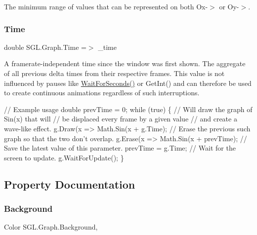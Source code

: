 The minimum range of values that can be represented on both Ox-\/$>$ or Oy-\/$>$. 

\mbox{\label{class_s_g_l_1_1_graph_a900eb624d0906d4e14a0f0a0be4ad791}} 
\subsubsection{\texorpdfstring{Time}{Time}}
{\footnotesize\ttfamily double S\+G\+L.\+Graph.\+Time =$>$ \+\_\+time}



A framerate-\/independent time since the window was first shown. The aggregate of all previous delta times from their respective frames. This value is not influenced by pauses like \mbox{\hyperlink{class_s_g_l_1_1_graph_aac0d51ab73e1f78788e9ecb6afc9d532}{Wait\+For\+Seconds()}} or Get\+Int() and can therefore be used to create continuous animations regardless of such interruptions. 


\begin{DoxyCode}
\textcolor{comment}{// Example usage}
\textcolor{keywordtype}{double} prevTime = 0;
\textcolor{keywordflow}{while} (\textcolor{keyword}{true}) 
\{   
    \textcolor{comment}{// Will draw the graph of Sin(x) that will}
    \textcolor{comment}{// be displaced every frame by a given value }
    \textcolor{comment}{// and create a wave-like effect.}
    g.Draw(x => Math.Sin(x + g.Time);
    \textcolor{comment}{// Erase the previous such graph so that the two don't overlap. }
    g.Erase(x => Math.Sin(x + prevTime);
    \textcolor{comment}{// Save the latest value of this parameter.}
    prevTime = g.Time;
    \textcolor{comment}{// Wait for the screen to update.}
    g.WaitForUpdate();
\}
\end{DoxyCode}
 

\subsection{Property Documentation}
\mbox{\label{class_s_g_l_1_1_graph_a56d255eb64277564347b848684a8bb97}} 
\subsubsection{\texorpdfstring{Background}{Background}}
{\footnotesize\ttfamily Color S\+G\+L.\+Graph.\+Background\hspace{0.3cm}{\ttfamily [get]}, {\ttfamily [set]}}



